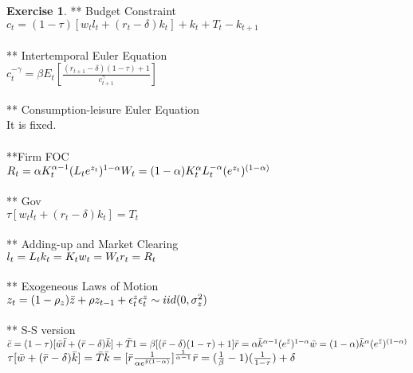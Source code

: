 \documentclass[letterpaper,12pt]{article}
\theoremstyle{definition}
\newtheorem{exercise}[theorem]{Exercise}
\begin{document}
\begin{spacing}{1.5}
	\begin{exercise} \label{DSGE_HW_NoLeisure}
** Budget Constraint \\
$c_t = (1-\tau)[w_tl_t + (r_t-\delta)k_t] + k_t + T_t - k_{t+1}$\\
\\** Intertemporal Euler Equation\\
$c_t^{-\gamma} = \beta E_t[\frac{(r_{t+1}-\delta)(1-\tau) +1}{c_{t+1}^{\gamma}}]$
\\
\\** Consumption-leisure Euler Equation\\
It is fixed.\\
\\**Firm FOC\\
$R_t = \alpha K_t^{\alpha-1}(L_te^{z_t})^{1-\alpha}\\
W_t = (1-\alpha)K_t^{\alpha}L_t^{-\alpha} (e^{z_t})^{ (1-\alpha)}$
\\
\\** Gov\\
$\tau[w_tl_t + (r_t-\delta)k_t] = T_t$
\\
\\** Adding-up and Market Clearing\\
$l_t = L_t\\
k_t = K_t\\
w_t = W_t\\
r_t = R_t$
\\
\\** Exogeneous Laws of Motion\\
$z_t = (1-\rho_z)\bar{z} + \rho z_{t-1} +\epsilon_t^z\\
\epsilon_t^z \sim iid(0, \sigma_z^2) $
\\
\\
** S-S version\\
$\bar{c} = (1-\tau)[\bar{w}\bar{l} + (\bar{r}-\delta)\bar{k}] + \bar{T}\\
1 = \beta [(\bar{r}-\delta)(1-\tau) +1]\\
\bar{r} = \alpha \bar{k}^{\alpha-1}(e^{\bar{z}})^{1-\alpha} \\
\bar{w} = (1-\alpha)\bar{k}^{\alpha}(e^{\bar{z}})^{ (1-\alpha)}$\\
$\tau[\bar{w} + (\bar{r}-\delta)\bar{k}] = \bar{T}
\\
\\
\bar{k} = [\bar{r}\frac{1}{\alpha e^{\bar{z}(1-\alpha)}}]^{\frac{1}{\alpha -1}}\\
\bar{r} = (\frac{1}{\beta} - 1)(\frac{1}{1-\tau}) + \delta
$
	\end{exercise}


\end{spacing}
\end{document}
